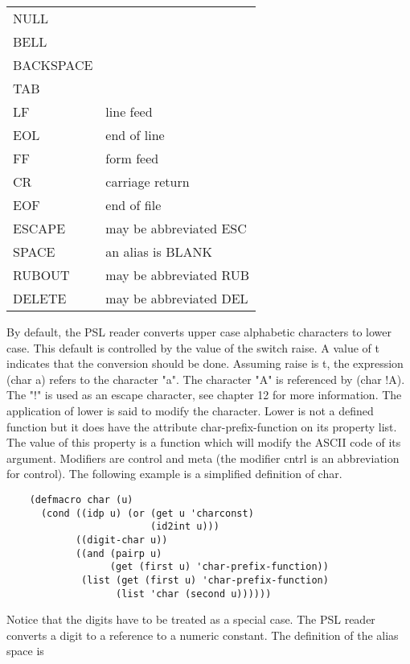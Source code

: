 \vspace{0.5cm}
 \begin{center}
\begin{tabular}{ll}
    NULL\\
    BELL\\
    BACKSPACE\\
    TAB\\
    LF &         line feed\\
    EOL &        end of line\\
    FF &         form feed\\
    CR &         carriage return\\
    EOF &        end of file\\
    ESCAPE &     may be abbreviated ESC\\
    SPACE &      an alias is BLANK\\
    RUBOUT &     may be abbreviated RUB\\
    DELETE &     may be abbreviated DEL \\
\end{tabular}
\end{center}
\vspace{0.5cm}    
				By default, the PSL reader converts  upper  case  alphabetic
    characters to lower case.  This default is controlled by the
    value  of the switch raise. A value of t indicates that the
    conversion should be done. Assuming  raise  is  t, the
    expression (char  a) refers to the character "a". The
    character "A" is referenced by (char !A). The "!" is used as an
    escape character, see chapter 12 for  more  information.  The
    application of lower is said to modify the character.  Lower is not
    a defined  function  but it  does  have  the  attribute 
    char-prefix-function  on its property list.  The value of this 
    property  is  a  function which  will modify the ASCII code of its
    argument. Modifiers are control and meta (the modifier cntrl is an
    abbreviation  for  control). The following example is a simplified
    definition of char.

\begin{verbatim}
    (defmacro char (u)
      (cond ((idp u) (or (get u 'charconst)
                         (id2int u)))
            ((digit-char u))
            ((and (pairp u)
                  (get (first u) 'char-prefix-function))
             (list (get (first u) 'char-prefix-function)
                   (list 'char (second u))))))
\end{verbatim}
    Notice that the digits have to be treated as a special case.
    The  PSL reader converts a digit to a reference to a numeric
    constant.  The definition of the alias space is

